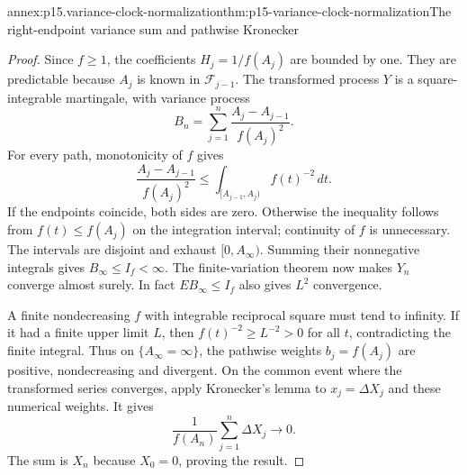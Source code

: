 \begin{annexitem}{annex:p15.variance-clock-normalization}{thm:p15-variance-clock-normalization}{The right-endpoint variance sum and pathwise Kronecker}
\begin{proof}
Since \(f\geq1\), the coefficients \(H_j=1/f(A_j)\) are bounded
by one. They are predictable because \(A_j\) is known in
\(\mathcal F_{j-1}\). The transformed process \(Y\) is a
square-integrable martingale, with variance process
\[
                           B_n=\sum_{j=1}^n
                                    \frac{A_j-A_{j-1}}{f(A_j)^2}.
\]
For every path, monotonicity of \(f\) gives
\[
            \frac{A_j-A_{j-1}}{f(A_j)^2}
                         \leq\int_{[A_{j-1},A_j)}f(t)^{-2}\,dt.
\]
If the endpoints coincide, both sides are zero.
Otherwise the inequality follows from \(f(t)\leq f(A_j)\)
on the integration interval; continuity of \(f\) is unnecessary.
The intervals are disjoint and exhaust \([0,A_\infty)\).
Summing their nonnegative integrals gives
\(B_\infty\leq I_f<\infty\).
The finite-variation theorem now makes \(Y_n\) converge almost
surely. In fact \(EB_\infty\leq I_f\) also gives \(L^2\) convergence.

A finite nondecreasing \(f\) with integrable reciprocal square
must tend to infinity. If it had a finite upper limit \(L\),
then \(f(t)^{-2}\geq L^{-2}>0\) for all \(t\), contradicting
the finite integral.
Thus on \(\{A_\infty=\infty\}\), the pathwise weights
\(b_j=f(A_j)\) are positive, nondecreasing and divergent.
On the common event where the transformed series converges,
apply Kronecker's lemma to \(x_j=\Delta X_j\) and these
numerical weights. It gives
\[
                    \frac1{f(A_n)}\sum_{j=1}^n\Delta X_j\longrightarrow0.
\]
The sum is \(X_n\) because \(X_0=0\), proving the result.
\end{proof}
\end{annexitem}

